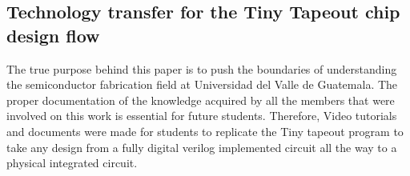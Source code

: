 \subsection{Technology transfer for the Tiny Tapeout chip design flow}

The true purpose behind this paper is to push the boundaries of understanding the semiconductor fabrication field at Universidad del Valle de Guatemala. The proper documentation of the knowledge acquired by all the members that were involved on this work is essential for future students. Therefore, Video tutorials and documents were made for students to replicate the Tiny tapeout program to take any design from a fully digital verilog implemented circuit all the way to a physical integrated circuit. 

